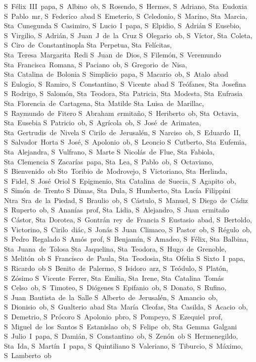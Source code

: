 S~F\'elix~III~papa, S~Albino~ob, S~Rosendo, S~Hermes, S~Adriano, Sta~Eudoxia
S~Pablo~mr, S~Federico~abad
S~Emeterio, S~Celedonio, S~Marino, Sta~Marcia, Sta~Cunegunda
S~Casimiro, S~Lucio~I~papa, S~Elpidio, S~Adri\'an
S~Eusebio, S~Virgilio, S~Adri\'an, S~Juan~J~de~la~Cruz
S~Olegario~ob, S~V\'ictor, Sta~Coleta, S~Ciro~de~Constantinopla
Sta~Perpetua, Sta~Fel\'icitas, Sta~Teresa~Margarita~Redi
S~Juan~de~Dios, S~Filem\'on, S~Veremundo
Sta~Francisca~Romana, S~Paciano~ob, S~Gregorio~de~Nisa, Sta~Catalina~de~Bolonia
S~Simplicio~papa, S~Macario~ob, S~Atalo~abad
S~Eulogio, S~Ramiro, S~Constantino, S~Vicente~abad
S~Te\'ofanes, Sta~Josefina
S~Rodrigo, S~Salom\'on, Sta~Teodora, Sta~Patricia, Sta~Modesta, Sta~Eufrasia
Sta~Florencia~de~Cartagena, Sta~Matilde
Sta~Luisa~de~Marillac, S~Raymundo~de~Fitero
S~Abraham~ermita\~no, S~Heriberto~ob, Sta~Octavia, Sta~Eusebia
S~Patricio~ob, S~Agr\'icola~ob, S~Jos\'e~de~Arimatea, Sta~Gertrudis~de~Nivela
S~Cirilo~de~Jerusal\'en, S~Narciso~ob, S~Eduardo~II, S~Salvador~Horta
S~Jos\'e, S~Apolonio~ob, S~Leoncio
S~Cutberto, Sta~Eufemia, Sta~Alejandra, S~Vulfrano, S~Marte
S~Nicol\'as~de~Flue, Sta~Fabiola, Sta~Clemencia
S~Zacar\'ias~papa, Sta~Lea, S~Pablo~ob, S~Octaviano, S~Bienvenido~ob
Sto~Toribio~de~Modrovejo, S~Victoriano, Sta~Herlinda, S~Fidel, S~Jos\'e~Oriol
S~Epigmenio, Sta~Catalina~de~Suecia, S~Agapito~ob, S~Sim\'on~de~Trento
S~Dimas, Sta~Dula, S~Humberto, Sta~Luc\'ia~Filippini
Ntra~Sra~de~la~Piedad, S~Braulio~ob, S~C\'astulo, S~Manuel, S~Diego~de~C\'adiz
S~Ruperto~ob, S~Anan\'ias~prof, Sta~Lidia, S~Alejandro, S~Juan~ermita\~no
S~C\'astor, Sta~Dorotea, S~Gontr\'an~rey~de~Francia
S~Eustasio~abad, S~Bertoldo, S~Victorino, S~Cirilo~di\'ac, S~Jon\'as
S~Juan~Climaco, S~Pastor~ob, S~R\'egulo~ob, S~Pedro~Regalado
S~Am\'os~prof, S~Benjam\'in, S~Amadeo, S~F\'elix, Sta~Balbina, Sta~Juana~de~Tolosa
Sta~Jaquelina, Sta~Teodora, S~Hugo~de~Grenoble, S~Melit\'on~ob
S~Francisco~de~Paula, Sta~Teodosia, Sta~Ofelia
S~Sixto~I~papa, S~Ricardo~ob
S~Benito~de~Palermo, S~Isidoro~arz, S~Te\'odulo, S~Plat\'on, S~Z\'osimo
S~Vicente~Ferrer, Sta~Emilia, Sta~Irene, Sta~Catalina~Tom\'as
S~Celso~ob, S~Timoteo, S~Di\'ogenes
S~Epifanio~ob, S~Donato, S~Rufino, S~Juan~Bautista~de~la~Salle
S~Alberto~de~Jerusal\'en, S~Amancio~ob, S~Dionisio~ob, S~Gualterio~abad
Sta~Mar\'ia~Cleofas, Sta~Casilda, S~Acacio~ob, S~Demetrio, S~Pr\'ocoro
S~Apolonio~pbro, S~Pompeyo, S~Ezequiel~prof, S~Miguel~de~los~Santos
S~Estanislao~ob, S~Felipe~ob, Sta~Gemma~Galgani
S~Julio~I~papa, S~Dami\'an, S~Constantino~ob, S~Zen\'on~ob
S~Hermenegildo, Sta~Ida, S~Mart\'in~I~papa, S~Quintiliano
S~Valeriano, S~Tiburcio, S~M\'aximo, S~Lamberto~ob
